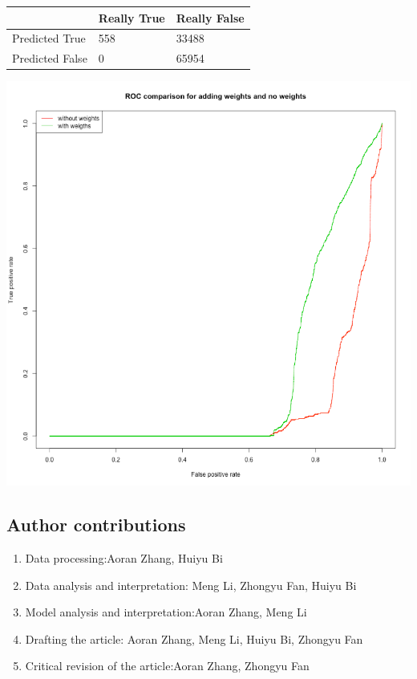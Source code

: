 \documentclass{article}
\begin{document}
\begin{spacing}{1}
\begin{large}
\vspace{5mm}
\begin{tabular}{| l | l | l |}
	\hline
	& Really True & Really False \\ \hline
	Predicted True & 558 & 33488 \\ \hline
	Predicted False & 0 & 65954\\
	\hline
\end{tabular}
\vspace{5mm}

\includegraphics[scale = 0.8]{ROCwithandwithoutweights.png}

\subsection{Author contributions}
\begin{enumerate}
	\item
	Data processing:Aoran Zhang, Huiyu Bi
	\item
	Data analysis and interpretation: Meng Li, Zhongyu Fan, Huiyu Bi
	\item
	Model analysis and interpretation:Aoran Zhang, Meng Li
	\item
	Drafting the article: Aoran Zhang, Meng Li, Huiyu Bi, Zhongyu Fan
	\item
	Critical revision of the article:Aoran Zhang, Zhongyu Fan
	

\end{enumerate}
\end{large}
\end{spacing}
\end{document}
